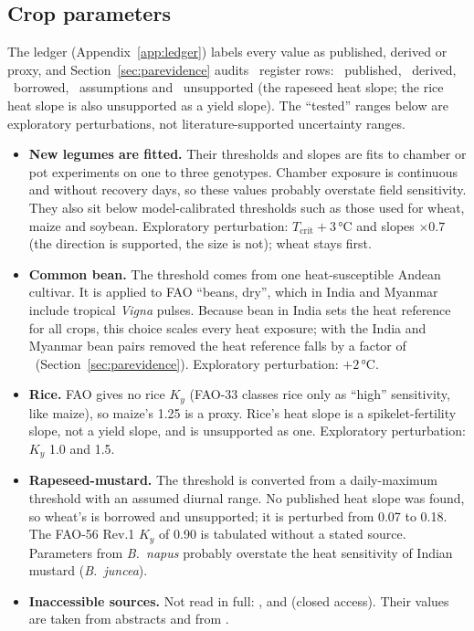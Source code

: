 \subsection{Crop parameters}
The ledger (Appendix~\ref{app:ledger}) labels every value as published, derived or proxy, and
Section~\ref{sec:parevidence} audits \parNRows\ register rows: \parNPublished\ published, \parNDerived\ derived,
\parNBorrowed\ borrowed, \parNAssumption\ assumptions and \parNUnsupported\ unsupported (the rapeseed heat slope; the
rice heat slope is also unsupported as a yield slope). The ``tested'' ranges below are exploratory perturbations, not
literature-supported uncertainty ranges.
\begin{itemize}
\item \textbf{New legumes are fitted.} Their thresholds and slopes are fits to chamber or pot experiments on one
to three genotypes. Chamber exposure is continuous and without recovery days, so these values probably overstate
field sensitivity. They also sit below model-calibrated thresholds such as those used for wheat, maize and soybean.
Exploratory perturbation: $T_{\text{crit}}+3$\,\si{\celsius} and slopes $\times0.7$ (the direction is supported, the
size is not); wheat stays first.
\item \textbf{Common bean.} The threshold comes from one heat-susceptible Andean cultivar. It is applied to FAO
``beans, dry'', which in India and Myanmar include tropical \emph{Vigna} pulses. Because bean in India sets the heat
reference for all crops, this choice scales every heat exposure; with the India and Myanmar bean pairs removed the
heat reference falls by a factor of \scrHeatRatio\ (Section~\ref{sec:parevidence}). Exploratory perturbation: $+2$\,\si{\celsius}.
\item \textbf{Rice.} FAO gives no rice $K_y$ (FAO-33 classes rice only as ``high'' sensitivity, like maize), so
maize's 1.25 is a proxy. Rice's heat slope is a spikelet-fertility slope, not a yield slope, and is unsupported as
one. Exploratory perturbation: $K_y$ 1.0 and 1.5.
\item \textbf{Rapeseed-mustard.} The threshold is converted from a daily-maximum threshold with an assumed diurnal
range. No published heat slope was found, so wheat's is borrowed and unsupported; it is perturbed from 0.07 to 0.18. The FAO-56 Rev.1
$K_y$ of 0.90 is tabulated without a stated source. Parameters from \emph{B.~napus} probably overstate the heat
sensitivity of Indian mustard (\emph{B.~juncea}).
\item \textbf{Inaccessible sources.} Not read in full: \citet{prasad2002bean}, \citet{prasad2003peanut} and
\citet{morrison2002} (closed access). Their values are taken from abstracts and from \citet{boote2005}.
\end{itemize}

